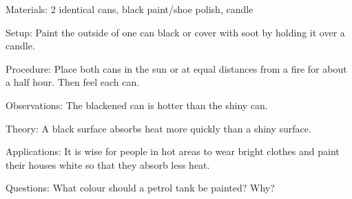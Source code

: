 \begin{multicols}{2}
\begin{description*}
\item[Materials:]{2 identical cans, black paint/shoe polish, candle}
\item[Setup:]{Paint the outside of one can black or cover with soot by holding it over a candle.}
\item[Procedure:]{Place both cans in the sun or at equal distances from a fire for about a half hour. Then feel each can.}
\item[Observations:]{The blackened can is hotter than the shiny can.}
\item[Theory:]{A black surface absorbs heat more quickly than a shiny surface.}
\item[Applications:]{It is wise for people in hot areas to wear bright clothes and paint their houses white so that they absorb less heat.}
\item[Questions:]{What colour should a petrol tank be painted? Why?}
\end{description*}



\end{multicols}

\pagebreak